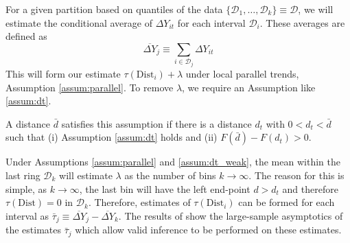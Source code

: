 \documentclass[10pt]{article}
\newcommand{\dist}{\text{Dist}}
\begin{document}
For a given partition based on quantiles of the data $\{ \mathcal{D}_1, \dots, \mathcal{D}_k \} \equiv \mathcal{D}$, we will estimate the conditional average of $\Delta Y_{it}$ for each interval $\mathcal{D}_i$. These averages are defined as 
\[
    \overline{\Delta Y}_j \equiv \sum_{i \in \mathcal{D}_j} \Delta Y_{it} 
\]
This will form our estimate $\tau(\dist_i) + \lambda$ under local parallel trends, Assumption \ref{assum:parallel}. To remove $\lambda$, we require an Assumption like \ref{assum:dt}.

\begin{assumption}\label{assum:dt_weak}
    A distance $\bar{d}$ satisfies this assumption if there is a distance $d_t$ with $0 < d_t < \bar{d}$ such that (i) Assumption \ref{assum:dt} holds and (ii) $F(\bar{d}) - F(d_t) > 0$.
\end{assumption}

Under Assumptions \ref{assum:parallel} and \ref{assum:dt_weak}, the mean within the last ring $\mathcal{D}_k$ will estimate $\lambda$ as the number of bins $k \to \infty$. The reason for this is simple, as $k \to \infty$, the last bin will have the left end-point $d > d_t$ and therefore $\tau(\dist) = 0$ in $\mathcal{D}_k$. Therefore, estimates of $\tau(\dist_i)$ can be formed for each interval as $\bar{\tau}_j \equiv \overline{\Delta Y}_j - \overline{\Delta Y}_k$. The results of \citet{Cattaneo_Crump_Farrell_Feng_2019} show the large-sample asymptotics of the estimates $\bar{\tau}_j$ which allow valid inference to be performed on these estimates.  

\newpage~
\end{document}
